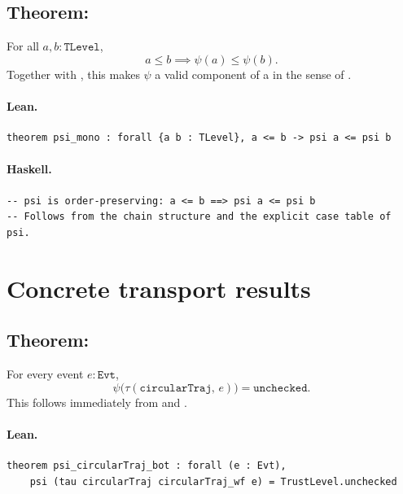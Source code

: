 \documentclass[11pt,a4paper]{article}
\begin{document}
\subsection{Theorem: }

\begin{thm}
For all $a, b : \mathtt{TLevel}$,
\[
  a \le b \implies \psi(a) \le \psi(b).
\]
Together with , this makes $\psi$ a valid 
component of a  in the sense of .
\end{thm}

\paragraph{Lean.}
\begin{lstlisting}[style=lean]
theorem psi_mono : forall {a b : TLevel}, a <= b -> psi a <= psi b
\end{lstlisting}

\paragraph{Haskell.}
\begin{lstlisting}[style=haskell]
-- psi is order-preserving: a <= b ==> psi a <= psi b
-- Follows from the chain structure and the explicit case table of psi.
\end{lstlisting}

\section{Concrete transport results}

\subsection{Theorem: }

\begin{thm}
For every event $e : \mathtt{Evt}$,
\[
  \psi\bigl(\tau(\mathtt{circularTraj},\, e)\bigr) = \mathtt{unchecked}.
\]
This follows immediately from  and
.
\end{thm}

\paragraph{Lean.}
\begin{lstlisting}[style=lean]
theorem psi_circularTraj_bot : forall (e : Evt),
    psi (tau circularTraj circularTraj_wf e) = TrustLevel.unchecked
\end{lstlisting}
\end{document}
